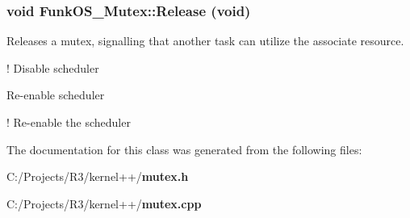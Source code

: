 \subsubsection[{Release}]{\setlength{\rightskip}{0pt plus 5cm}void FunkOS\_\-Mutex::Release (void)}\label{class_funk_o_s___mutex_a89af3fe26d3df2862dc9151bbaa47675}
Releases a mutex, signalling that another task can utilize the associate resource. 

! Disable scheduler

Re-\/enable scheduler

! Re-\/enable the scheduler 

The documentation for this class was generated from the following files:\begin{DoxyCompactItemize}
\item 
C:/Projects/R3/kernel++/{\bf mutex.h}\item 
C:/Projects/R3/kernel++/{\bf mutex.cpp}\end{DoxyCompactItemize}
